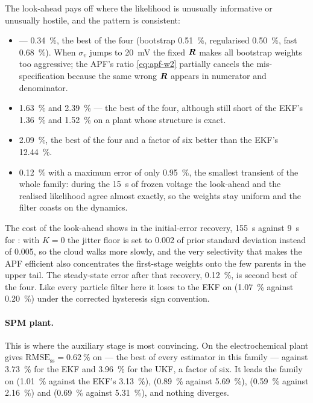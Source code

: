 The look-ahead pays off where the likelihood is unusually informative or unusually hostile, and the
pattern is consistent:
\begin{itemize}[leftmargin=2em]
  \item {} --- \SI{0.34}{\percent}, the best of the four (bootstrap
        \SI{0.51}{\percent}, regularised \SI{0.50}{\percent}, fast \SI{0.68}{\percent}).  When
        $\sigma_v$ jumps to \SI{20}{\milli\volt} the fixed $\bm{R}$ makes all bootstrap weights too
        aggressive; the APF's ratio \eqref{eq:apf-w2} partially cancels the mis-specification
        because the same wrong $\bm{R}$ appears in numerator and denominator.
  \item {} \SI{1.63}{\percent} and  \SI{2.39}{\percent} --- the
        best of the four, although still short of the EKF's \SI{1.36}{\percent} and
        \SI{1.52}{\percent} on a plant whose structure is exact.
  \item {} \SI{2.09}{\percent}, the best of the four and a factor of six better than
        the EKF's \SI{12.44}{\percent}.
  \item {} \SI{0.12}{\percent} with a maximum error of only \SI{0.95}{\percent},
        the smallest transient of the whole family: during the \SI{15}{\second} of frozen voltage
        the look-ahead and the realised likelihood agree almost exactly, so the weights stay uniform
        and the filter coasts on the dynamics.
\end{itemize}
The cost of the look-ahead shows in the initial-error recovery, \SI{155}{\second} against
\SI{9}{\second} for : with $K=0$ the jitter floor is set to \num{0.002} of
prior standard deviation instead of \num{0.005}, so the cloud walks more slowly, and the very
selectivity that makes the APF efficient also concentrates the first-stage weights onto the few
parents in the upper tail.  The steady-state error after that recovery, \SI{0.12}{\percent}, is
second best of the four.  Like every particle filter here it loses to the EKF on 
(\SI{1.07}{\percent} against \SI{0.20}{\percent}) under the corrected hysteresis sign convention.

\paragraph{SPM plant.}  This is where the auxiliary stage is most convincing.  On the
electrochemical plant  gives $\mathrm{RMSE}_{\mathrm{ss}} =
\SI{0.62}{\percent}$ on  --- the best of every estimator in this family --- against
\SI{3.73}{\percent} for the EKF and \SI{3.96}{\percent} for the UKF, a factor of six.  It leads the
family on  (\SI{1.01}{\percent} against the EKF's \SI{3.13}{\percent}),
 (\SI{0.89}{\percent} against \SI{5.69}{\percent}), 
(\SI{0.59}{\percent} against \SI{2.16}{\percent}) and  (\SI{0.69}{\percent}
against \SI{5.31}{\percent}), and nothing diverges.

